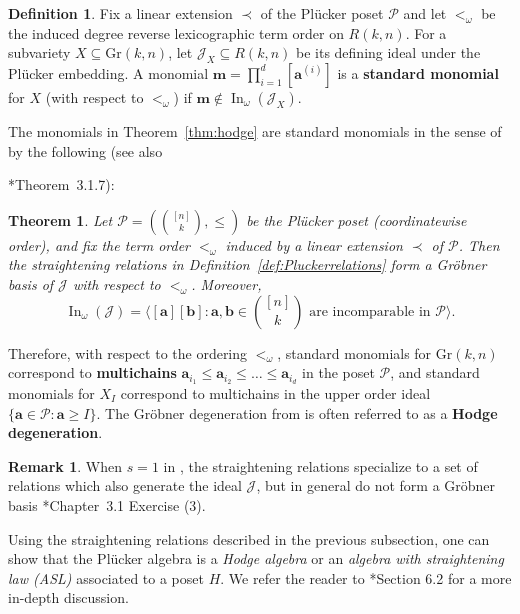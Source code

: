\documentclass[12pt,reqno]{amsart}
\newtheorem{theorem}[lemma]{Theorem}
\theoremstyle{definition}
\newtheorem{definition}[lemma]{Definition}
\newtheorem{remark}[lemma]{Remark}
\newcommand{\inn}{\operatorname{In}}
\renewcommand{\aa}{\mathbf a}
\newcommand{\bb}{\mathbf b}
\newcommand{\mm}{\mathbf m}
\newcommand{\cJ}{\mathcal{J}}
\newcommand{\cP}{\mathcal{P}}
\newcommand{\gr}{\mathrm{Gr}}
\begin{document}
\begin{definition}\label{def:std-mon}
Fix a linear extension \(\prec\) of the Pl\"ucker poset \(\mathcal P\) and let \(<_\omega\)
be the induced degree reverse lexicographic term order on \(R(k,n)\).
For a subvariety \(X\subseteq \gr(k,n)\), let \(\cJ_X\subseteq R(k,n)\) be its defining ideal
under the Pl\"ucker embedding.
A monomial \(\mm=\prod_{i=1}^d[\aa^{(i)}]\) is a \textbf{standard monomial} for \(X\)
(with respect to \(<_\omega\)) if \(\mm\notin \inn_\omega(\cJ_X)\).
\end{definition}



The monomials in Theorem~\ref{thm:hodge} are standard monomials in the sense of  by the following (see also {\cite{SturmfelsAlgo}*{Theorem~3.1.7}):

\begin{theorem}\cite{SturmfelsWhite}\label{thm:grgrobner}
Let \(\mathcal P=(\binom{[n]}{k},\le)\) be the Pl\"ucker poset (coordinatewise order),
and fix the term order \(<_\omega\) induced by a linear extension \(\prec\) of \(\mathcal P\).
Then the straightening relations in Definition~\ref{def:Pluckerrelations} form a
Gr\"obner basis of \(\cJ\) with respect to \(<_\omega\). Moreover,
\[
\inn_\omega(\cJ)=\langle [\aa][\bb] : \aa,\bb\in \binom{[n]}{k}
\text{ are incomparable in }\mathcal P \rangle.
\]
\end{theorem}



Therefore, with respect to the ordering $<_\omega$, standard monomials for $\gr(k,n)$ correspond to \textbf{multichains} $\aa_{i_1} \leq \aa_{i_2} \leq \dots \leq \aa_{i_d}$ in the poset $\cP$, and standard monomials for $X_I$ correspond to multichains in the upper order ideal $\{\aa\in \cP: \aa\geq I\}$. 
The Gr\"{o}bner degeneration from  is often referred to as a \textbf{Hodge degeneration}.
\begin{remark}
    When $s = 1$ in , the straightening relations specialize to 
    a set of relations which also generate the ideal $\cJ$, but in general do not form a Gr\"obner basis \cite{SturmfelsAlgo}*{Chapter~3.1 Exercise (3)}.
\end{remark}

Using the straightening relations described in the previous subsection, one can show that the Pl\"{u}cker algebra is a \emph{Hodge algebra} or an \emph{algebra with straightening law (ASL)} associated to a poset $H$.  
We refer the reader to \cite{bruns2022determinants}*{Section 6.2} for a more in-depth discussion.

}
\end{document}
